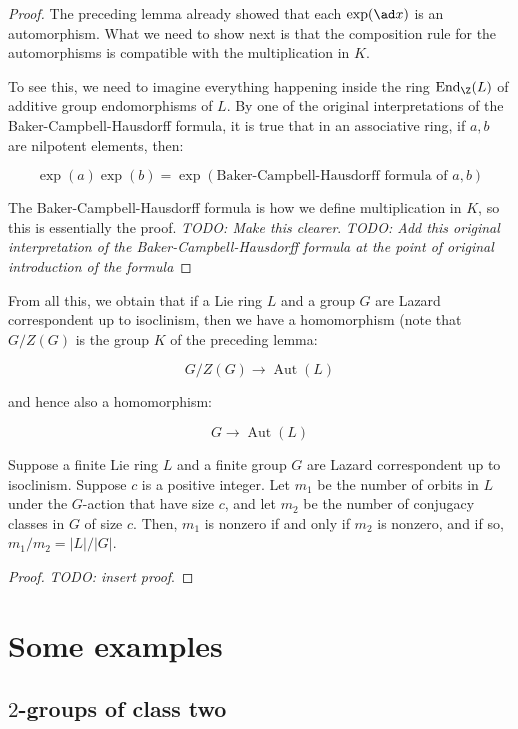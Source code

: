 \begin{proof}
  The preceding lemma already showed that each $\exp(\ad x)$ is an
  automorphism. What we need to show next is that the composition rule
  for the automorphisms is compatible with the multiplication in $K$.

  To see this, we need to imagine everything happening inside the ring
  $\operatorname{End}_{\Z}(L)$ of additive group endomorphisms of
  $L$. By one of the original interpretations of the
  Baker-Campbell-Hausdorff formula, it is true that in an associative
  ring, if $a,b$ are nilpotent elements, then:

  $$\exp(a)\exp(b) = \exp(\text{Baker-Campbell-Hausdorff formula of } a,b)$$
  
  The Baker-Campbell-Hausdorff formula is how we define multiplication
  in $K$, so this is essentially the proof. {\em TODO: Make this
  clearer}. {\em TODO: Add this original interpretation of the
  Baker-Campbell-Hausdorff formula at the point of original
  introduction of the formula}
\end{proof}

From all this, we obtain that if a Lie ring $L$ and a group $G$ are
Lazard correspondent up to isoclinism, then we have a homomorphism
(note that $G/Z(G)$ is the group $K$ of the preceding lemma:

$$G/Z(G) \to \operatorname{Aut}(L)$$

and hence also a homomorphism:

$$G \to \operatorname{Aut}(L)$$

\begin{lemma}
  Suppose a finite Lie ring $L$ and a finite group $G$ are Lazard
  correspondent up to isoclinism. Suppose $c$ is a positive
  integer. Let $m_1$ be the number of orbits in $L$ under the
  $G$-action that have size $c$, and let $m_2$ be the number of
  conjugacy classes in $G$ of size $c$. Then, $m_1$ is nonzero if and
  only if $m_2$ is nonzero, and if so, $m_1/m_2 = |L|/|G|$.
\end{lemma}

\begin{proof}
  {\em TODO: insert proof}.
\end{proof}

\newpage

\section{Some examples}

\subsection{$2$-groups of class two}


